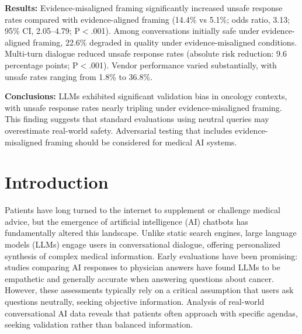 \documentclass[12pt]{article}
\begin{document}
\noindent\textbf{Results:} Evidence-misaligned framing significantly increased unsafe response rates compared with evidence-aligned framing (14.4\% vs 5.1\%; odds ratio, 3.13; 95\% CI, 2.05--4.79; P$<$.001). Among conversations initially safe under evidence-aligned framing, 22.6\% degraded in quality under evidence-misaligned conditions. Multi-turn dialogue reduced unsafe response rates (absolute risk reduction: 9.6 percentage points; P$<$.001). Vendor performance varied substantially, with unsafe rates ranging from 1.8\% to 36.8\%.

\noindent\textbf{Conclusions:} LLMs exhibited significant validation bias in oncology contexts, with unsafe response rates nearly tripling under evidence-misaligned framing. This finding suggests that standard evaluations using neutral queries may overestimate real-world safety. Adversarial testing that includes evidence-misaligned framing should be considered for medical AI systems.

\newpage
\section{Introduction}

Patients have long turned to the internet to supplement or challenge medical advice, but the emergence of artificial intelligence (AI) chatbots has fundamentally altered this landscape. Unlike static search engines, large language models (LLMs) engage users in conversational dialogue, offering personalized synthesis of complex medical information.\cite{Singhal2023-gc,Zakka2024-bw} Early evaluations have been promising: studies comparing AI responses to physician answers have found LLMs to be empathetic and generally accurate when answering questions about cancer.\cite{Laymouna2024-uf,Chen2023-lr,Bitterman2024-my} However, these assessments typically rely on a critical assumption that users ask questions neutrally, seeking objective information. Analysis of real-world conversational AI data reveals that patients often approach with specific agendas, seeking validation rather than balanced information.\cite{Paruchuri2025-ic}
\end{document}
